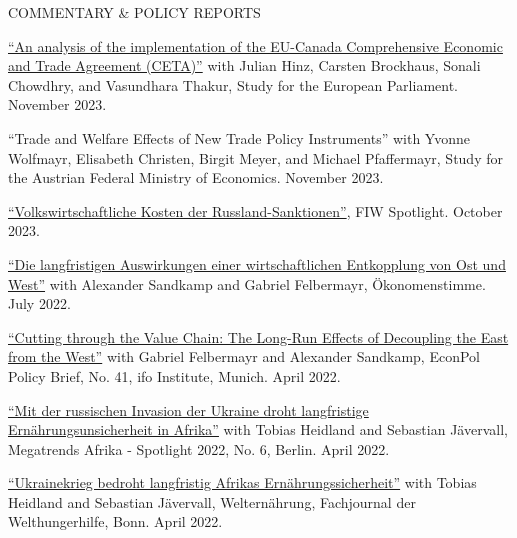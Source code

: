 \documentclass{article}
\begin{document}

\begin{minipage}[t]{0.12\textwidth}
    {\selectfont COMMENTARY \& POLICY REPORTS} \\
\end{minipage}
\hspace{5mm}
\begin{minipage}[t]{0.8\textwidth}
    \href{https://www.europarl.europa.eu/RegData/etudes/IDAN/2023/754440/EXPO_IDA(2023)754440_EN.pdf}{``An analysis of the implementation of the EU-Canada Comprehensive Economic and Trade Agreement (CETA)''} with Julian Hinz, Carsten Brockhaus, Sonali Chowdhry, and Vasundhara Thakur, Study for the European Parliament. November 2023. \par
    ``Trade and Welfare Effects of New Trade Policy Instruments'' with Yvonne Wolfmayr, Elisabeth Christen, Birgit Meyer, and Michael Pfaffermayr, Study for the Austrian Federal Ministry of Economics. November 2023.\par
    \href{https://www.fiw.ac.at/2023/10/02/volkswirtschaftliche-kosten-der-russland-sanktionen/}{``Volkswirtschaftliche Kosten der Russland-Sanktionen''}, FIW Spotlight. October 2023. \par
    \href{https://www.oekonomenstimme.org/artikel/2022/07/die-langfristigen-auswirkungen-einer-wirtschaftlichen-entkopplung-von-ost-und-west/}{``Die langfristigen Auswirkungen einer wirtschaftlichen Entkopplung von Ost und West''} with Alexander Sandkamp and Gabriel Felbermayr, Ökonomenstimme. July 2022. \par
    \href{https://www.cesifo.org/en/publikationen/2022/working-paper/cutting-through-value-chain-long-run-effects-decoupling-east-west}{``Cutting through the Value Chain: The Long-Run Effects of Decoupling the East from the West''} with Gabriel Felbermayr and Alexander Sandkamp, EconPol Policy Brief, No. 41, ifo Institute, Munich. April 2022. \par
    \href{https://www.megatrends-afrika.de/publikation/mit-der-russischen-invasion-der-ukraine-droht-langfristige-ernaehrungsunsicherheit-in-afrika}{``Mit der russischen Invasion der Ukraine droht langfristige Ernährungsunsicherheit in Afrika''} with Tobias Heidland and Sebastian Jävervall, Megatrends Afrika - Spotlight 2022, No. 6, Berlin. April 2022. \par
    \href{https://www.welthungerhilfe.de/welternaehrung/rubriken/agrar-ernaehrungspolitik/wie-der-ukrainekrieg-afrikas-brotversorgung-trifft/}{``Ukrainekrieg bedroht langfristig Afrikas Ernährungssicherheit''} with Tobias Heidland and Sebastian Jävervall, Welternährung, Fachjournal der Welthungerhilfe, Bonn. April 2022. \par

\end{minipage}
\end{document}
